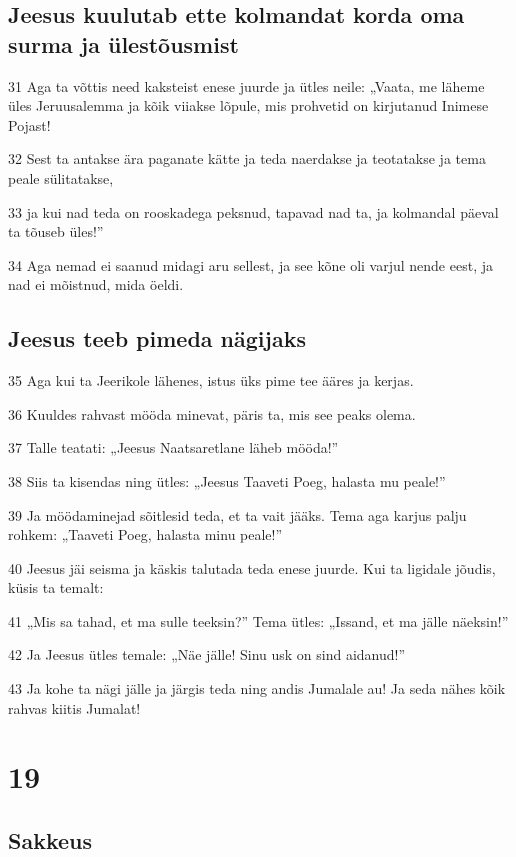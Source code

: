 \section*{Jeesus kuulutab ette kolmandat korda oma surma ja ülestõusmist}

\par 31 Aga ta võttis need kaksteist enese juurde ja ütles neile: „Vaata, me läheme üles Jeruusalemma ja kõik viiakse lõpule, mis prohvetid on kirjutanud Inimese Pojast!
\par 32 Sest ta antakse ära paganate kätte ja teda naerdakse ja teotatakse ja tema peale sülitatakse,
\par 33 ja kui nad teda on rooskadega peksnud, tapavad nad ta, ja kolmandal päeval ta tõuseb üles!”
\par 34 Aga nemad ei saanud midagi aru sellest, ja see kõne oli varjul nende eest, ja nad ei mõistnud, mida öeldi.

\section*{Jeesus teeb pimeda nägijaks}

\par 35 Aga kui ta Jeerikole lähenes, istus üks pime tee ääres ja kerjas.
\par 36 Kuuldes rahvast mööda minevat, päris ta, mis see peaks olema.
\par 37 Talle teatati: „Jeesus Naatsaretlane läheb mööda!”
\par 38 Siis ta kisendas ning ütles: „Jeesus Taaveti Poeg, halasta mu peale!”
\par 39 Ja möödaminejad sõitlesid teda, et ta vait jääks. Tema aga karjus palju rohkem: „Taaveti Poeg, halasta minu peale!”
\par 40 Jeesus jäi seisma ja käskis talutada teda enese juurde. Kui ta ligidale jõudis, küsis ta temalt:
\par 41 „Mis sa tahad, et ma sulle teeksin?” Tema ütles: „Issand, et ma jälle näeksin!”
\par 42 Ja Jeesus ütles temale: „Näe jälle! Sinu usk on sind aidanud!”
\par 43 Ja kohe ta nägi jälle ja järgis teda ning andis Jumalale au! Ja seda nähes kõik rahvas kiitis Jumalat!


\chapter{19}

\section*{Sakkeus}

